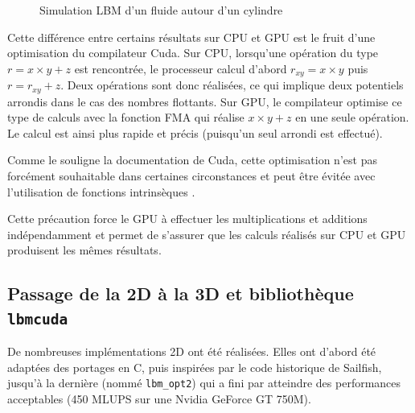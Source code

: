 \begin{figure}[h]
{		\label{fig:lbm_42000}
	}
	\caption{Simulation \ac{LBM} d'un fluide autour d'un cylindre}
	\label{fig:lbm_5000_to_43000}
\end{figure}

Cette différence entre certains résultats sur \ac{CPU} et \ac{GPU} est le fruit d'une optimisation du compilateur Cuda. Sur \ac{CPU}, lorsqu'une opération du type $r = x \times y+z$ est rencontrée, le processeur calcul d'abord $r_{xy} = x \times y$ puis $r = r_{xy} + z$. Deux opérations sont donc réalisées, ce qui implique deux potentiels arrondis dans le cas des nombres flottants. Sur \ac{GPU}, le compilateur optimise ce type de calculs \cite{noauthor_cuda_2017-1} avec la fonction \ac{FMA} qui réalise $x \times y+z$ en une seule opération. Le calcul est ainsi plus rapide et précis (puisqu'un seul arrondi est effectué).

Comme le souligne la documentation de Cuda, cette optimisation n'est pas forcément souhaitable dans certaines circonstances et peut être évitée avec l'utilisation de fonctions intrinsèques \cite{noauthor_cuda_2017-1, noauthor_cuda_2017-2}.

Cette précaution force le \ac{GPU} à effectuer les multiplications et additions indépendamment et permet de s’assurer que les calculs réalisés sur \ac{CPU} et \ac{GPU} produisent les mêmes résultats.

\subsection{Passage de la 2D à la 3D et bibliothèque \texttt{lbmcuda}}
De nombreuses implémentations 2D ont été réalisées. Elles ont d’abord été adaptées des portages en C, puis inspirées par le code historique de Sailfish, jusqu’à la dernière (nommé \texttt{lbm\_opt2}) qui a fini par atteindre des performances acceptables (450 MLUPS sur une Nvidia GeForce GT 750M). 

